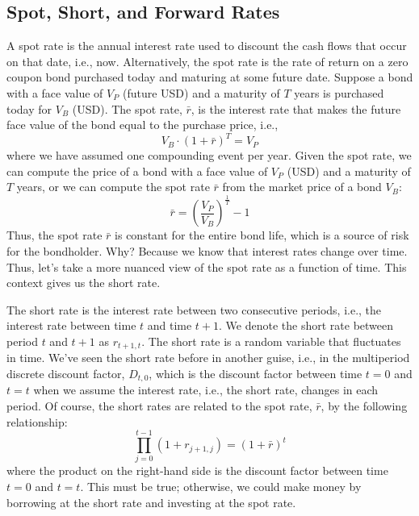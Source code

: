 \documentclass[11pt]{article}
\theoremstyle{definition}
\begin{document}
\subsection{Spot, Short, and Forward Rates}
A spot rate is the annual interest rate used to discount the cash flows that occur on that date, i.e., now. Alternatively, the spot rate is the rate of return on a zero coupon bond purchased today and maturing at some future date. Suppose a bond with a face value of $V_{P}$ (future USD) and a maturity of $T$ years is purchased today for $V_{B}$ (USD). The spot rate, $\bar{r}$, is the interest rate that makes the future face value of the bond equal to the purchase price, i.e.,
\begin{equation}
V_{B}\cdot(1+\bar{r})^{T} = V_{P}
\end{equation}
where we have assumed one compounding event per year. Given the spot rate, we can compute the price of a bond with a face value of $V_{P}$ (USD) and a maturity of $T$ years, or we can compute the spot rate $\bar{r}$ from the market price of a bond $V_{B}$:
\begin{equation}
\bar{r} = \left(\frac{V_{P}}{V_{B}}\right)^{\frac{1}{T}}-1
\end{equation}
Thus, the spot rate $\bar{r}$ is constant for the entire bond life, which is a source of risk for the bondholder.
Why? Because we know that interest rates change over time. Thus, let's take a more nuanced view of the spot rate as a function of time. This context gives us the short rate.

The short rate is the interest rate between two consecutive periods, i.e., the interest rate between time $t$ and time $t+1$. We denote the short rate between period $t$ and $t+1$ as $r_{t+1,t}$. The short rate is a random variable that fluctuates in time. We've seen the short rate before in another guise, i.e., in the multiperiod discrete discount factor, $D_{t,0}$, which is the discount factor between time $t = 0$ and $t = t$ when we assume the 
interest rate, i.e., the short rate, changes in each period. Of course, the short rates are related to the spot rate, $\bar{r}$, by the following relationship:
\begin{equation}
\prod_{j=0}^{t-1}\left(1+r_{j+1,j}\right) = \left(1+\bar{r}\right)^{t}
\end{equation}
where the product on the right-hand side is the discount factor between time $t = 0$ and $t = t$.
This must be true; otherwise, we could make money by borrowing at the short rate and investing at the spot rate.
\end{document}
